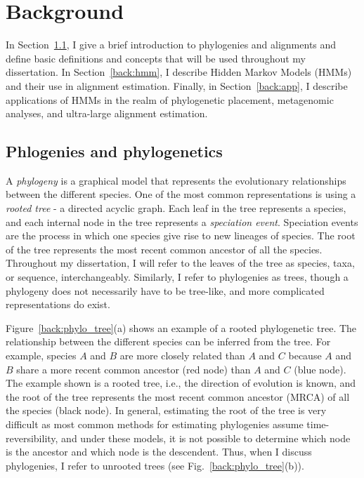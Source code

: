 \chapter{Background}
\label{background}%
In Section~\ref{back:phylogenetics}, I give a brief introduction to phylogenies and alignments and define basic definitions and concepts that will be used throughout my dissertation.  In Section~\ref{back:hmm}, I describe Hidden Markov Models (HMMs) and their use in alignment estimation. Finally, in Section~\ref{back:app}, I describe applications of HMMs in the realm of phylogenetic placement, metagenomic analyses, and ultra-large alignment estimation.

\section{Phlogenies and phylogenetics}\label{back:phylogenetics}
A \emph{phylogeny} is a graphical model that represents the evolutionary relationships between the different species.  One of the most common representations is using a \emph{rooted tree} - a directed acyclic graph.  Each leaf in the tree represents a species, and each internal node in the tree represents a \emph{speciation event}.  Speciation events are the process in which one species give rise to new lineages of species.  The root of the tree represents the most recent common ancestor of all the species.  Throughout my dissertation, I will refer to the leaves of the tree as species, taxa, or sequence, interchangeably.  Similarly, I refer to phylogenies as trees, though a phylogeny does not necessarily have to be tree-like, and more complicated representations do exist.

Figure~\ref{back:phylo_tree}(a) shows an example of a rooted phylogenetic tree.  The relationship between the different species can be inferred from the tree.  For example, species $A$ and $B$ are more closely related than $A$ and $C$ because $A$ and $B$ share a more recent common ancestor (red node) than $A$ and $C$ (blue node). The example shown is a rooted tree, i.e., the direction of evolution is known, and the root of the tree represents the most recent common ancestor (MRCA) of all the species (black node).  In general, estimating the root of the tree is very difficult as most common methods for estimating phylogenies assume time-reversibility, and under these models, it is not possible to determine which node is the ancestor and which node is the descendent.  Thus, when I discuss phylogenies, I refer to unrooted trees (see Fig.~\ref{back:phylo_tree}(b)).

